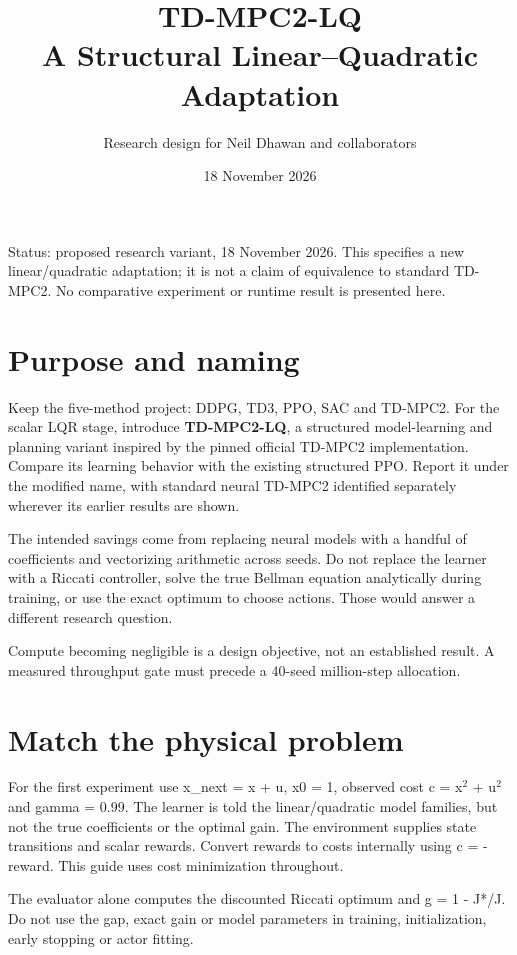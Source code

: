 \documentclass[11pt]{article}
\title{TD-MPC2-LQ\\A Structural Linear--Quadratic Adaptation}
\author{Research design for Neil Dhawan and collaborators}
\date{18 November 2026}
\begin{document}
\maketitle


Status: proposed research variant, 18 November 2026. This specifies a new linear/quadratic adaptation; it is not a claim of equivalence to standard TD-MPC2. No comparative experiment or runtime result is presented here.

\section{Purpose and naming}

Keep the five-method project: DDPG, TD3, PPO, SAC and TD-MPC2. For the scalar LQR stage, introduce \textbf{TD-MPC2-LQ}, a structured model-learning and planning variant inspired by the pinned official TD-MPC2 implementation. Compare its learning behavior with the existing structured PPO. Report it under the modified name, with standard neural TD-MPC2 identified separately wherever its earlier results are shown.

The intended savings come from replacing neural models with a handful of coefficients and vectorizing arithmetic across seeds. Do not replace the learner with a Riccati controller, solve the true Bellman equation analytically during training, or use the exact optimum to choose actions. Those would answer a different research question.

Compute becoming negligible is a design objective, not an established result. A measured throughput gate must precede a 40-seed million-step allocation.

\section{Match the physical problem}

For the first experiment use x\_next = x + u, x0 = 1, observed cost c = x\ensuremath{^2} + u\ensuremath{^2} and gamma = 0.99. The learner is told the linear/quadratic model families, but not the true coefficients or the optimal gain. The environment supplies state transitions and scalar rewards. Convert rewards to costs internally using c = -reward. This guide uses cost minimization throughout.

The evaluator alone computes the discounted Riccati optimum and g = 1 - J*/J. Do not use the gap, exact gain or model parameters in training, initialization, early stopping or actor fitting.
\end{document}
